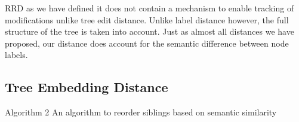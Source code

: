 RRD as we have defined it does not contain a mechanism to enable tracking of modifications unlike tree edit distance. Unlike label distance however, the full structure of the tree is taken into account. Just as almost all distances we have proposed, our distance does account for the semantic difference between node labels.



\subsection{Tree Embedding Distance}

Algorithm 2 An algorithm to reorder siblings based on semantic
similarity


